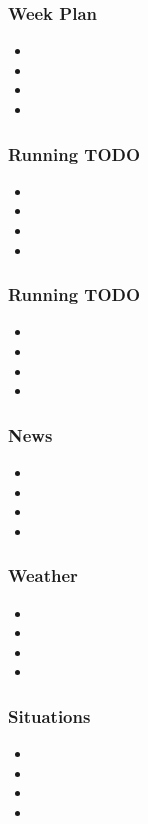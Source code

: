 \documentclass[serif, mathserif, final]{beamer}
\begin{document}
    \begin{frame}
      \frametitle{Week Plan} 
        \begin{itemize}
          \tiny \item \tiny
        \item \tiny
        \item \tiny
        \item \tiny
        \end{itemize}
      \end{frame}

    \begin{frame}
      \frametitle{Running TODO} 
        \begin{itemize}
          \tiny \item \tiny
        \item \tiny
        \item \tiny
        \item \tiny
        \end{itemize}
      \end{frame}


    \begin{frame}
      \frametitle{Running TODO} 
        \begin{itemize}
          \tiny \item \tiny
        \item \tiny
        \item \tiny
        \item \tiny
        \end{itemize}
      \end{frame}


    \begin{frame}
      \frametitle{News} 
        \begin{itemize}
          \tiny \item \tiny
        \item \tiny
        \item \tiny
        \item \tiny
        \end{itemize}
      \end{frame}

    \begin{frame}
      \frametitle{Weather} 
        \begin{itemize}
          \tiny \item \tiny
        \item \tiny
        \item \tiny
        \item \tiny
        \end{itemize}
      \end{frame}

   \begin{frame}
      \frametitle{Situations} 
        \begin{itemize}
          \tiny \item \tiny
        \item \tiny
        \item \tiny
        \item \tiny
        \end{itemize}
      \end{frame}
\end{document}
